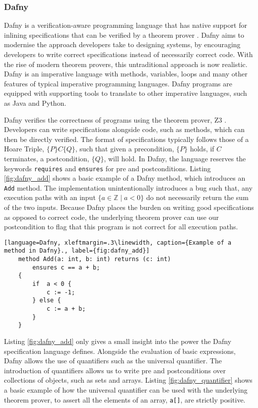\subsubsection{Dafny}
Dafny is a verification-aware programming language that has native support for inlining specifications that can be verified by a theorem prover \cite{dafny_paper}. Dafny aims to modernise the approach developers take to designing systems, by encouraging developers to write correct specifications instead of necessarily correct code. With the rise of modern theorem provers, this untraditional approach is now realistic. Dafny is an imperative language with methods, variables, loops and many other features of typical imperative programming languages. Dafny programs are equipped with supporting tools to translate to other imperative languages, such as Java and Python. 
\par
Dafny verifies the correctness of programs using the theorem prover, Z3 \cite{z3}. Developers can write specifications alongside code, such as methods, which can then be directly verified. The format of specifications typically follows those of a Hoare Triple, $\{P\}C\{Q\}$, such that given a precondition, $\{P\}$ holds, if $C$ terminates, a postcondition, $\{Q\}$, will hold. In Dafny, the language reserves the keywords \texttt{requires} and \texttt{ensures} for pre and postconditions. Listing \ref{fig:dafny_add} shows a basic example of a Dafny method, which introduces an \texttt{Add} method. The implementation unintentionally introduces a bug such that, any execution paths with an input $\{ a \in \mathbb{Z} \mid a < 0 \}$ do not necessarily return the sum of the two inputs. Because Dafny places the burden on writing good specifications as opposed to correct code, the underlying theorem prover can use our postcondition to flag that this program is not correct for all execution paths.
\begin{lstlisting}[language=Dafny, xleftmargin=.3\linewidth, caption={Example of a method in Dafny}., label={fig:dafny_add}]
    method Add(a: int, b: int) returns (c: int)
        ensures c == a + b;
    {
        if  a < 0 {
            c := -1;
        } else {
            c := a + b;
        }
    }
\end{lstlisting}
\par
Listing \ref{fig:dafny_add} only gives a small insight into the power the Dafny specification language defines. Alongside the evaluation of basic expressions, Dafny allows the use of quantifiers such as the universal quantifier. The introduction of quantifiers allows us to write pre and postconditions over collections of objects, such as sets and arrays. Listing \ref{fig:dafny_quantifier} shows a basic example of how the universal quantifier can be used with the underlying theorem prover, to assert all the elements of an array, \texttt{a[]}, are strictly positive.
